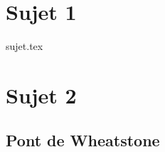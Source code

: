 \documentclass[a4paper, 11pt]{book}
\begin{document}
\resetQ
\newpage

\chapter{Sujet 1}

{sujet.tex}

\resetQ
\newpage

\chapter{Sujet 2}
\section{Pont de Wheatstone}
\end{document}
